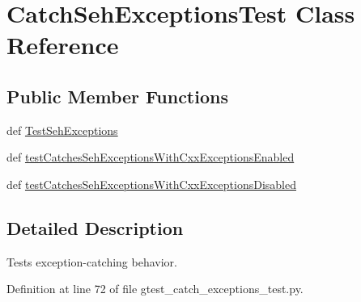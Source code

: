 \hypertarget{classgtest__catch__exceptions__test_1_1CatchSehExceptionsTest}{\section{\-Catch\-Seh\-Exceptions\-Test \-Class \-Reference}
\label{da/d80/classgtest__catch__exceptions__test_1_1CatchSehExceptionsTest}
}
\subsection*{\-Public \-Member \-Functions}
\begin{DoxyCompactItemize}
\item 
def \hyperlink{classgtest__catch__exceptions__test_1_1CatchSehExceptionsTest_a15f0248b8254bbf27f42b025dc39a446}{\-Test\-Seh\-Exceptions}
\item 
def \hyperlink{classgtest__catch__exceptions__test_1_1CatchSehExceptionsTest_a1a406fa4c4c8a37b0ea8ad1a29ab63bc}{test\-Catches\-Seh\-Exceptions\-With\-Cxx\-Exceptions\-Enabled}
\item 
def \hyperlink{classgtest__catch__exceptions__test_1_1CatchSehExceptionsTest_a1409a2624e94968f14171c253ec9c2b5}{test\-Catches\-Seh\-Exceptions\-With\-Cxx\-Exceptions\-Disabled}
\end{DoxyCompactItemize}


\subsection{\-Detailed \-Description}
\begin{DoxyVerb}Tests exception-catching behavior.\end{DoxyVerb}
 

\-Definition at line 72 of file gtest\-\_\-catch\-\_\-exceptions\-\_\-test.\-py.



